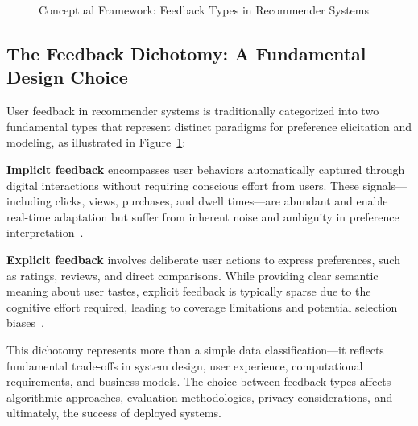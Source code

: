 \begin{figure}[ht]
\caption{Conceptual Framework: Feedback Types in Recommender Systems}
\label{fig:feedback_framework}
\end{figure}

\subsection{The Feedback Dichotomy: A Fundamental Design Choice}

User feedback in recommender systems is traditionally categorized into two fundamental types that represent distinct paradigms for preference elicitation and modeling, as illustrated in Figure~\ref{fig:feedback_framework}:

\textbf{Implicit feedback} encompasses user behaviors automatically captured through digital interactions without requiring conscious effort from users. These signals—including clicks, views, purchases, and dwell times—are abundant and enable real-time adaptation but suffer from inherent noise and ambiguity in preference interpretation~\cite{hu2008collaborative,pan2008one}.

\textbf{Explicit feedback} involves deliberate user actions to express preferences, such as ratings, reviews, and direct comparisons. While providing clear semantic meaning about user tastes, explicit feedback is typically sparse due to the cognitive effort required, leading to coverage limitations and potential selection biases~\cite{herlocker2004evaluating,adomavicius2005toward}.

This dichotomy represents more than a simple data classification—it reflects fundamental trade-offs in system design, user experience, computational requirements, and business models. The choice between feedback types affects algorithmic approaches, evaluation methodologies, privacy considerations, and ultimately, the success of deployed systems.

